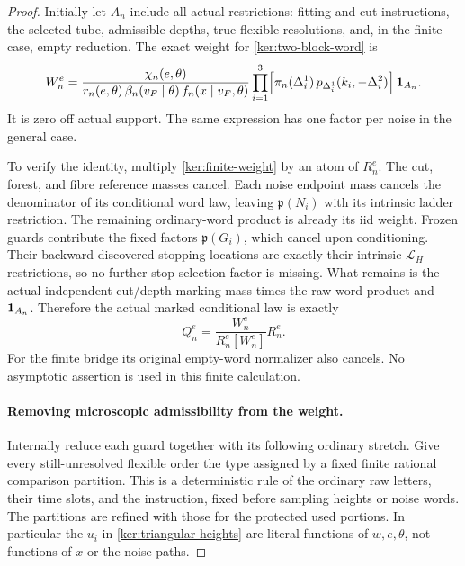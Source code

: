 \begin{proof}
Initially let \(A_n\) include all actual restrictions: fitting and
cut instructions, the selected tube, admissible depths, true flexible
resolutions, and, in the finite case, empty reduction.  The exact
weight for \eqref{ker:two-block-word} is
\begin{equation}\label{ker:finite-weight}
 W_n^e=
 \frac{\chi_n(e,\theta)}
 {r_n(e,\theta)\,\beta_n(v_F\mid\theta)\,
                         f_n(x\mid v_F,\theta)}
 \prod_{i=1}^{3}\!\left[
   \pi_n(\Delta_i^1)\,
   p_{\Delta_i^1}(k_i,-\Delta_i^2)\right]\1_{A_n}.
\end{equation}
It is zero off actual support.  The same expression has one factor
per noise in the general case.

To verify the identity, multiply \eqref{ker:finite-weight} by an
atom of \(R_n^e\).  The cut, forest, and fibre reference masses cancel.
Each noise endpoint mass cancels the denominator of its conditional
word law, leaving \(\mathfrak p(N_i)\) with its intrinsic ladder
restriction.  The remaining ordinary-word product is already its
iid weight.  Frozen guards contribute the fixed factors
\(\mathfrak p(G_i)\), which cancel upon conditioning.  Their
backward-discovered stopping locations are exactly their intrinsic
\(\mathcal L_H\) restrictions, so no further stop-selection factor
is missing.  What remains is the actual independent cut/depth marking
mass times the raw-word product and \(\mathbf 1_{A_n}\).
Therefore the actual marked conditional law is exactly
\[
 Q_n^e=\frac{W_n^e}{R_n^e[W_n^e]}R_n^e.
\]
For the finite bridge its original empty-word normalizer also cancels.
No asymptotic assertion is used in this finite calculation.

\paragraph{Removing microscopic admissibility from the weight.}
Internally reduce each guard together with its following ordinary
stretch.  Give every still-unresolved flexible order the type assigned
by a fixed finite rational comparison partition.  This is a
deterministic rule of the ordinary raw letters, their time slots,
and the instruction, fixed before sampling heights or noise words.
The partitions are refined with those for the protected used portions.
In particular the \(u_i\) in \eqref{ker:triangular-heights} are literal
functions of \(w,e,\theta\), not functions of \(x\) or the noise paths.


\end{proof}
